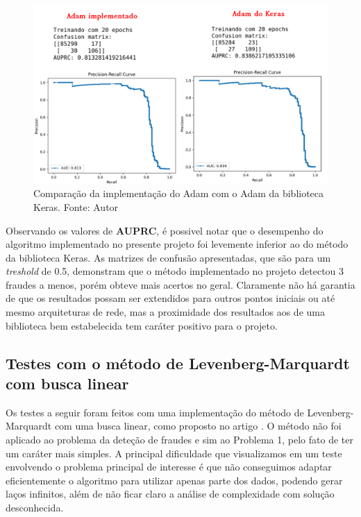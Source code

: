 \documentclass[11pt]{article}
\begin{document}
\begin{figure}[H]
\center
\includegraphics[scale=0.5]{Figuras/ADAM_VS_KERAS.png}
\caption{Comparação da implementação do Adam com o Adam da biblioteca Keras. Fonte: Autor} 
\label{AVK}
\end{figure}


\noindent
Observando os valores de \textbf{AUPRC}, é possivel notar que o desempenho do algoritmo implementado no presente projeto foi levemente inferior ao do método da biblioteca Keras. As matrizes de confusão apresentadas, que são para um \textit{treshold} de 0.5, demonstram que o método implementado no projeto detectou 3 fraudes a menos, porém obteve mais acertos no geral. Claramente não há garantia de que os resultados possam ser extendidos para outros pontos iniciais ou até mesmo arquiteturas de rede, mas a proximidade dos resultados aos de uma biblioteca bem estabelecida tem caráter positivo para o projeto.



\subsection*{Testes com o método de Levenberg-Marquardt com busca linear}
Os testes a seguir foram feitos com uma implementação do método de Levenberg-Marquardt com uma busca linear, como proposto no artigo  \cite{bmLS}. O método não foi aplicado ao problema da deteção de fraudes e sim ao Problema 1, pelo fato de ter um caráter mais simples. A principal dificuldade que visualizamos em um teste envolvendo o problema principal de interesse é que não conseguimos adaptar eficientemente o algoritmo para utilizar apenas parte dos dados, podendo gerar laços infinitos,  além de não ficar claro a análise de complexidade com solução desconhecida.
\end{document}
